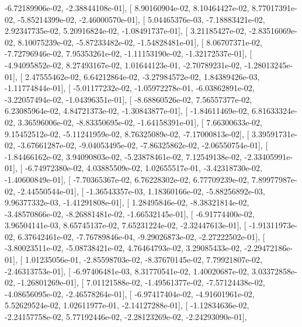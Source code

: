 \documentclass{article}
\begin{document}
         -6.72189906e-02,  -2.38844108e-01],
       [  8.90160904e-02,   8.10464427e-02,   8.77017391e-02,
         -5.85214399e-02,  -2.46000570e-01],
       [  5.04465376e-03,  -7.18883421e-02,   2.92347735e-02,
          5.20916824e-02,  -1.08491737e-01],
       [  3.21185427e-02,  -2.83516069e-02,   8.10075239e-02,
         -5.87233482e-02,  -1.54828481e-01],
       [  8.06707371e-02,  -7.72796946e-02,   7.95353261e-02,
         -1.11153190e-02,  -1.32172537e-01],
       [ -4.94095852e-02,   8.27493167e-02,   1.01644123e-01,
         -2.70789231e-02,  -1.28013245e-01],
       [  2.47555462e-02,   6.64212864e-02,  -3.27984572e-02,
          1.84389426e-03,  -1.11774844e-01],
       [ -5.01177232e-02,  -1.05972278e-01,  -6.03862891e-02,
         -3.22057494e-02,  -1.04396351e-01],
       [ -8.68860526e-02,   7.56557377e-02,   6.23085964e-02,
          4.84721373e-02,  -1.30843877e-01],
       [ -1.84611469e-02,   6.81633324e-02,   3.36596006e-02,
         -8.83350695e-02,  -1.64158391e-01],
       [  7.66300633e-02,   9.15452512e-02,  -5.11241959e-02,
          8.76325089e-02,  -7.17000813e-02],
       [  3.39591731e-02,  -3.67661287e-02,  -9.04053495e-02,
         -7.86325862e-02,  -2.06550754e-01],
       [ -1.84466162e-02,   3.94090803e-02,  -5.23878461e-02,
          7.12549138e-02,  -2.33405991e-01],
       [ -6.74972380e-02,   4.03885509e-02,   1.02655517e-01,
         -3.42318730e-02,  -1.40600849e-01],
       [ -7.70365367e-02,   6.76228302e-02,   6.77709239e-02,
          7.89977987e-02,  -2.44550544e-01],
       [ -1.36543357e-03,   1.18360166e-02,  -5.88256892e-03,
          9.96377332e-03,  -1.41291808e-01],
       [  1.28495846e-02,  -8.38321814e-02,  -3.48570866e-02,
         -8.26881481e-02,  -1.66532145e-01],
       [ -6.91774400e-02,   3.96504141e-03,   8.65745137e-02,
          7.65231224e-02,  -2.32447613e-01],
       [ -1.91311973e-02,   6.37642461e-02,  -7.76789846e-04,
         -9.29026873e-02,  -2.27222502e-01],
       [ -3.80023511e-02,  -5.08738421e-02,   4.76464793e-02,
          3.29085433e-02,  -2.29472186e-01],
       [  1.01235056e-01,  -2.85598703e-02,  -8.37670145e-02,
          7.79921807e-02,  -2.46313753e-01],
       [ -6.97406481e-03,   8.31770541e-02,   1.40020687e-02,
          3.03372858e-02,  -1.26801269e-01],
       [  7.01121588e-02,  -1.49561377e-02,  -7.57124438e-02,
         -4.08656095e-02,  -2.46578264e-01],
       [ -6.97417404e-02,  -4.91601961e-02,   5.52629524e-02,
          1.02611977e-01,  -2.14127288e-01],
       [ -1.12834636e-02,  -2.24157758e-02,   5.77192446e-02,
         -2.28123269e-02,  -2.24293090e-01],
\end{document}
